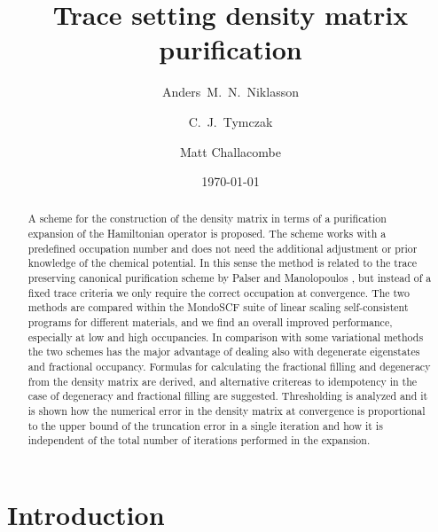 \commentoutA{\documentclass[prb,aps,twocolumn,twocolumngrid,secnumarabic,superbib,hyperref]{revtex4}}
\begin{document}
\date{\today}

\title{Trace setting density matrix purification}

\author{Anders~M.~N.~Niklasson}
\author{C.~J.~Tymczak}
\author{Matt Challacombe}

\begin{abstract}
A scheme for the construction of the density matrix in terms of
a purification expansion of the Hamiltonian operator is proposed. The scheme
works with a predefined occupation number and does not need
the additional adjustment or prior knowledge of the chemical potential.
In this sense the method is related to the trace preserving canonical 
purification scheme by Palser and Manolopoulos \cite{McWeeny60,Palser98}, 
but instead of a fixed trace criteria we only require the correct
occupation at convergence. The two methods are
compared within the MondoSCF suite of linear scaling self-consistent
programs for different materials, and we find an overall improved performance,
especially at low and high occupancies. In comparison
with some variational methods the two schemes has the major advantage of
dealing also with degenerate eigenstates and fractional occupancy. 
Formulas for calculating the fractional filling and degeneracy from 
the density matrix are derived, and alternative critereas to idempotency
in the case of degeneracy and fractional filling are suggested.
Thresholding is analyzed and it is shown how the numerical error 
in the density matrix at convergence is proportional to the upper bound of 
the truncation error in a single iteration and how it is independent of the total 
number of iterations performed in the expansion. 
%
%
\end{abstract}

\maketitle

\section{Introduction}
\end{document}
